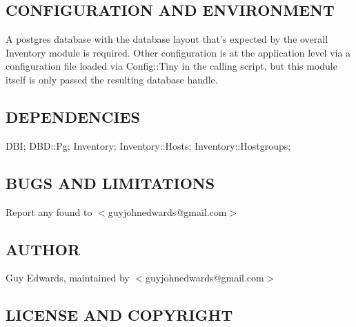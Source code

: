 \documentclass{book}
\begin{document}
\subsection{CONFIGURATION AND ENVIRONMENT}
\label{Inventory::Memberships_CONFIGURATION_AND_ENVIRONMENT}
\hypertarget{Inventory::Memberships_CONFIGURATION_AND_ENVIRONMENT}{}



A postgres database with the database layout that's expected by the overall Inventory module is required. Other configuration is at the application level via a configuration file loaded via Config::Tiny in the calling script, but this module itself is only passed the resulting database handle.


\subsection{DEPENDENCIES}
\label{Inventory::Memberships_DEPENDENCIES}
\hypertarget{Inventory::Memberships_DEPENDENCIES}{}



DBI; DBD::Pg; Inventory; Inventory::Hosts; Inventory::Hostgroups;


\subsection{BUGS AND LIMITATIONS}
\label{Inventory::Memberships_BUGS_AND_LIMITATIONS}
\hypertarget{Inventory::Memberships_BUGS_AND_LIMITATIONS}{}



Report any found to $<$guyjohnedwards@gmail.com$>$


\subsection{AUTHOR}
\label{Inventory::Memberships_AUTHOR}
\hypertarget{Inventory::Memberships_AUTHOR}{}



Guy Edwards, maintained by $<$guyjohnedwards@gmail.com$>$


\subsection{LICENSE AND COPYRIGHT}
\label{Inventory::Memberships_LICENSE_AND_COPYRIGHT}
\hypertarget{Inventory::Memberships_LICENSE_AND_COPYRIGHT}{}
\end{document}
